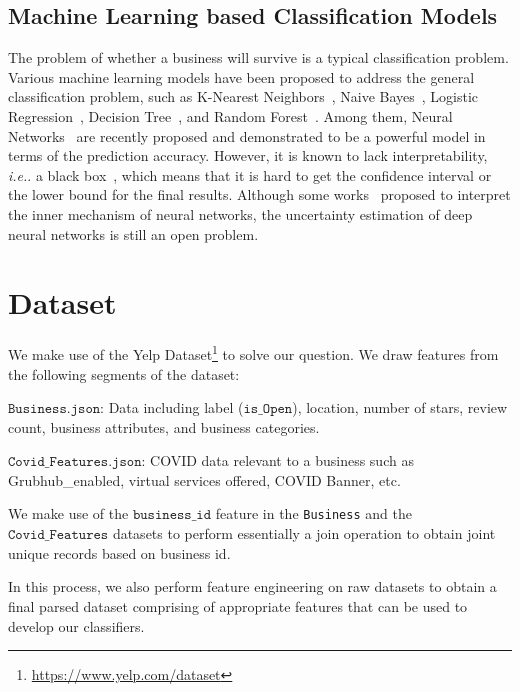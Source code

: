 \documentclass{article}
\begin{document}
  


\subsection{Machine Learning based Classification Models}
The problem of whether a business will survive is a typical classification problem. Various machine learning models have been proposed to address the general classification problem, such as K-Nearest Neighbors~\cite{horton1997better, knn}, Naive Bayes~\cite{rish2001empirical, mccallum1998comparison, bayes}, Logistic Regression~\cite{menard2002applied, kleinbaum2002logistic, lr}, Decision Tree~\cite{safavian1991survey, freund1999alternating, dt}, and Random Forest~\cite{liaw2002classification, svetnik2003random, rf}. Among them, Neural Networks~\cite{cichocki1993neural, hochreiter1997long, yegnanarayana2009artificial} are recently proposed and demonstrated to be a powerful model in terms of the prediction accuracy. However, it is known to lack interpretability, \textit{i.e.}. a black box~\cite{olden2002illuminating}, which means that it is hard to get the confidence interval or the lower bound for the final results. Although some works~\cite{alvarez2018towards, zhang2018interpretable} proposed to interpret the inner mechanism of neural networks, the uncertainty estimation of deep neural networks is still an open problem.


\section{Dataset}
We make use of the Yelp Dataset\footnote{\url{https://www.yelp.com/dataset}} to solve our question. We draw features from the following segments of the dataset:

$\texttt{Business.json}$: Data including label ($\texttt{is\_Open}$), location, number of stars, review count, business attributes, and business categories.

$\texttt{Covid\_Features.json}$: COVID data relevant to a business such as Grubhub\_enabled, virtual services offered, COVID Banner, etc.

We make use of the $\texttt{business\_id}$ feature in the \texttt{Business} and the $\texttt{Covid\_Features}$ datasets to perform essentially a join operation to obtain joint unique records based on business id. 

In this process, we also perform feature engineering on raw datasets to obtain a final parsed dataset comprising of appropriate features that can be used to develop our classifiers.   
\end{document}
